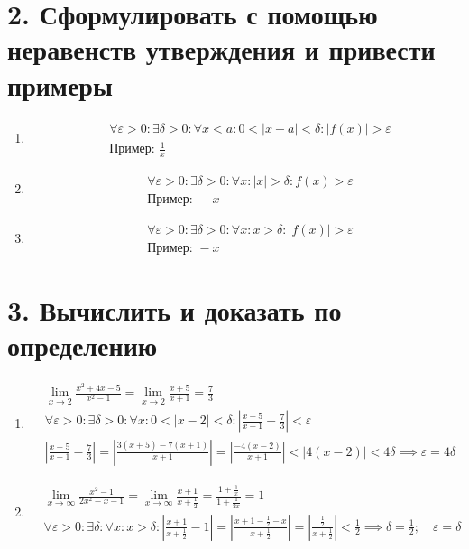\documentclass{article}
\begin{document}
\section*{2. Сформулировать с помощью неравенств утверждения и привести примеры}
\begin{enumerate}
    \item
    \begin{align*}
        & \forall \varepsilon > 0: \exists \delta > 0: \forall x < a: 0 < |x - a| < \delta: |f(x)| > \varepsilon \\
        & \text{Пример: } \frac{1}{x}
    \end{align*}

    \item
    \begin{align*}
        & \forall \varepsilon > 0: \exists \delta > 0: \forall x: |x| > \delta: f(x) > \varepsilon \\
        & \text{Пример: } -x
    \end{align*}

    \item 
    \begin{align*}
        & \forall \varepsilon > 0: \exists \delta > 0: \forall x: x > \delta: |f(x)| > \varepsilon \\
        & \text{Пример: } -x
    \end{align*}
\end{enumerate}

\section*{3. Вычислить и доказать по определению}
\begin{enumerate}
    \item 
    \begin{align*}
        & \lim\limits_{x \to 2}{\frac{x^{2} + 4x - 5}{x^{2} - 1}} = \lim\limits_{x \to 2}{\frac{x + 5}{x + 1}} = \frac{7}{3} \\
        & \forall \varepsilon > 0: \exists \delta > 0: \forall x: 0 < |x - 2| < \delta: |\frac{x + 5}{x + 1} - \frac{7}{3}| < \varepsilon \\
        & |\frac{x + 5}{x + 1} - \frac{7}{3}| = |\frac{3(x + 5) - 7(x + 1)}{x + 1}| = |\frac{-4(x - 2)}{x + 1}| < |4(x - 2)| < 4\delta \implies \varepsilon = 4\delta
    \end{align*}

    \item 
    \begin{align*}
        &\lim\limits_{x \to \infty}{\frac{x^{2} - 1}{2x^{2} - x - 1}} = \lim\limits_{x \to \infty}{\frac{x + 1}{x + \frac{1}{2}}} = \frac{1 + \frac{1}{x}}{1 + \frac{1}{2x}} = 1 \\
        &\forall \varepsilon > 0: \exists \delta: \forall x: x > \delta: |\frac{x + 1}{x + \frac{1}{2}} - 1| = |\frac{x + 1 - \frac{1}{2} - x}{x + \frac{1}{2}}| = |\frac{\frac{1}{2}}{x + \frac{1}{2}}|  < \frac{1}{2} \implies \delta = \frac{1}{2}; \quad \varepsilon = \delta
    \end{align*}
\end{enumerate}
\end{document}
